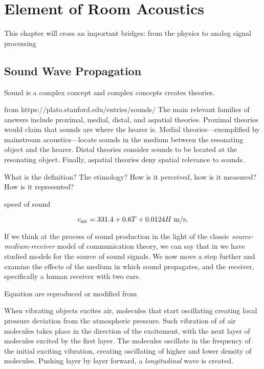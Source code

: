 \chapter{Element of Room Acoustics}\label{chap:acoustics}

 This chapter will cross an important bridges: from the physics to analog signal processing

\section{Sound Wave Propagation}

Sound is a complex concept and complex concepts creates theories.


from https://plato.stanford.edu/entries/sounds/
The main relevant families of answers include proximal, medial, distal, and aspatial theories.
Proximal theories would claim that sounds are where the hearer is.
Medial theories—exemplified by mainstream acoustics—locate sounds in the medium between the resonating object and the hearer.
Distal theories consider sounds to be located at the resonating object. Finally, aspatial theories deny spatial relevance to sounds.

What is the definition? The etimology?
How is it perceived, how is it measured? How is it represented?

speed of sound

\begin{equation}
    c_\text{air} =  331.4 + 0.6T + 0.0124H \; \text{m/s}
    .
\end{equation}


If we think at the process of sound production in the light of the classic \textit{source-medium-receiver} model of communication theory,
we can say that in we have studied models for the source of sound signals. We now move a step further and examine the effects of the medium in which sound propagates, and the receiver, specifically a human receiver with two ears.

Equation are reproduced or modified from \cite{Kuttruff2009room, Marczuk2006modelling, Habets2010generator, Avanzini2019Chapter4}

When vibrating objects excites air, molecules that start oscillating creating local pressure deviation from the atmospheric pressure.
Such vibration of of air molecules takes place in the direction of the excitement, with the next layer of molecules excited by the first layer.
The molecules oscillate in the frequency of the initial exciting vibration, creating oscillating of higher and lower density of molecules.
Pushing layer by layer forward, a \textit{longitudinal} wave is created.

